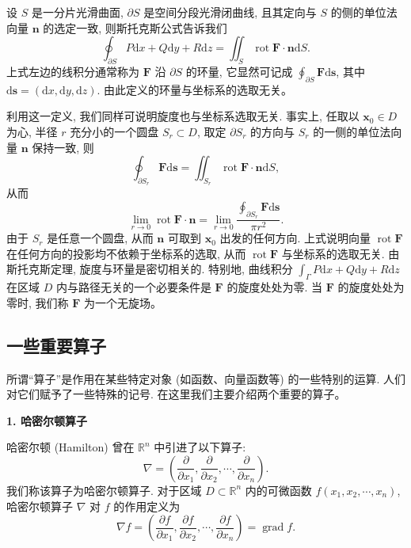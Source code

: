 \documentclass[UTF8,12pt,a4paper,fontset=fandol]{ctexart}
\begin{document}
设 $S$ 是一分片光滑曲面, $\partial S$ 是空间分段光滑闭曲线, 且其定向与 $S$ 的侧的单位法向量 $\boldsymbol n$ 的选定一致, 则斯托克斯公式告诉我们
\[
  \oint_{\partial S}P\mathrm dx+Q\mathrm dy+R\mathrm dz
  =
  \iint_S\operatorname{rot}\boldsymbol F\cdot\boldsymbol n\mathrm dS.
\]
上式左边的线积分通常称为 $\boldsymbol F$ 沿 $\partial S$ 的环量, 它显然可记成 $\oint_{\partial S}\boldsymbol F\mathrm d\boldsymbol s$, 其中 $\mathrm d\boldsymbol s=(\mathrm dx,\mathrm dy,\mathrm dz)$. 由此定义的环量与坐标系的选取无关。

利用这一定义, 我们同样可说明旋度也与坐标系选取无关. 事实上, 任取以 $\boldsymbol x_0\in D$ 为心, 半径 $r$ 充分小的一个圆盘 $S_r\subset D$, 取定 $\partial S_r$ 的方向与 $S_r$ 的一侧的单位法向量 $\boldsymbol n$ 保持一致, 则
\[
  \oint_{\partial S_r}\boldsymbol F\mathrm d\boldsymbol s
  =
  \iint_{S_r}\operatorname{rot}\boldsymbol F\cdot\boldsymbol n\mathrm dS,
\]
从而
\[
  \lim_{r\to0}\operatorname{rot}\boldsymbol F\cdot\boldsymbol n
  =
  \lim_{r\to0}
  \frac{\displaystyle\oint_{\partial S_r}\boldsymbol F\mathrm d\boldsymbol s}{\pi r^2}.
\]
由于 $S_r$ 是任意一个圆盘, 从而 $\boldsymbol n$ 可取到 $\boldsymbol x_0$ 出发的任何方向. 上式说明向量 $\operatorname{rot}\boldsymbol F$ 在任何方向的投影均不依赖于坐标系的选取, 从而 $\operatorname{rot}\boldsymbol F$ 与坐标系的选取无关. 由斯托克斯定理, 旋度与环量是密切相关的. 特别地, 曲线积分 $\int_\Gamma P\mathrm dx+Q\mathrm dy+R\mathrm dz$ 在区域 $D$ 内与路径无关的一个必要条件是 $\boldsymbol F$ 的旋度处处为零. 当 $\boldsymbol F$ 的旋度处处为零时, 我们称 $\boldsymbol F$ 为一个无旋场。

\subsection{一些重要算子}

所谓“算子”是作用在某些特定对象 (如函数、向量函数等) 的一些特别的运算. 人们对它们赋予了一些特殊的记号. 在这里我们主要介绍两个重要的算子。

\noindent\textbf{1. 哈密尔顿算子}

哈密尔顿 (Hamilton) 曾在 $\mathbb R^n$ 中引进了以下算子:
\[
  \nabla=\left(\frac{\partial}{\partial x_1},\frac{\partial}{\partial x_2},\cdots,\frac{\partial}{\partial x_n}\right).
\]
我们称该算子为哈密尔顿算子. 对于区域 $D\subset\mathbb R^n$ 内的可微函数 $f(x_1,x_2,\cdots,x_n)$, 哈密尔顿算子 $\nabla$ 对 $f$ 的作用定义为
\[
  \nabla f=\left(\frac{\partial f}{\partial x_1},\frac{\partial f}{\partial x_2},\cdots,\frac{\partial f}{\partial x_n}\right)=\operatorname{grad}f.
\]
\end{document}
